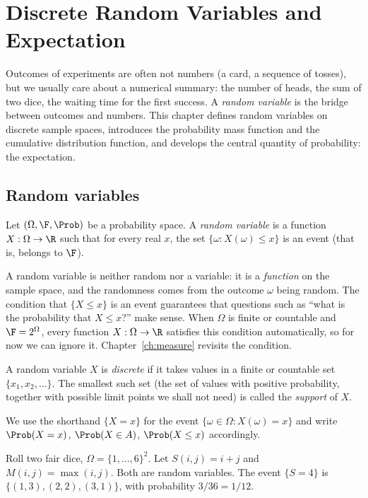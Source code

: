 \chapter{Discrete Random Variables and Expectation}
\label{ch:drv}

Outcomes of experiments are often not numbers (a card, a sequence of tosses),
but we usually care about a numerical summary: the number of heads, the sum of
two dice, the waiting time for the first success. A \emph{random variable}
is the bridge between outcomes and numbers. This chapter defines random
variables on discrete sample spaces, introduces the probability mass function
and the cumulative distribution function, and develops the central quantity of
probability: the expectation.

\section{Random variables}

\begin{definition}
Let $(\Omega,\F,\Prob)$ be a probability space. A \emph{random variable} is a
function $X:\Omega\to\R$ such that for every real $x$, the set
$\{\omega:X(\omega)\le x\}$ is an event (that is, belongs to $\F$).
\end{definition}

A random variable is neither random nor a variable: it is a \emph{function} on
the sample space, and the randomness comes from the outcome $\omega$ being
random. The condition that $\{X\le x\}$ is an event guarantees that questions
such as ``what is the probability that $X\le x$?'' make sense. When $\Omega$ is
finite or countable and $\F=2^\Omega$, every function $X:\Omega\to\R$ satisfies
this condition automatically, so for now we can ignore it. Chapter~\ref{ch:measure}
revisits the condition.

\begin{definition}
A random variable $X$ is \emph{discrete} if it takes values in a finite or
countable set $\{x_1,x_2,\dots\}$. The smallest such set (the set of values with
positive probability, together with possible limit points we shall not need) is
called the \emph{support} of $X$.
\end{definition}

We use the shorthand $\{X=x\}$ for the event $\{\omega\in\Omega:X(\omega)=x\}$ and
write $\Prob(X=x)$, $\Prob(X\in A)$, $\Prob(X\le x)$ accordingly.

\begin{example}
Roll two fair dice, $\Omega=\{1,\dots,6\}^2$. Let $S(i,j)=i+j$ and
$M(i,j)=\max(i,j)$. Both are random variables. The event $\{S=4\}$ is
$\{(1,3),(2,2),(3,1)\}$, with probability $3/36=1/12$.
\end{example}

